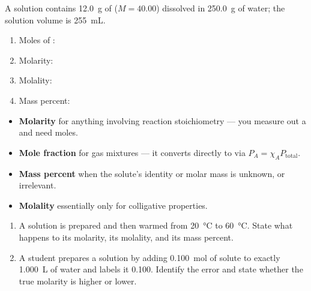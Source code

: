 \documentclass{apchem-notes}
\begin{document}

A solution contains \SI{12.0}{\gram} of  ($M = 40.00$) dissolved in
\SI{250.0}{\gram} of water; the solution volume is \SI{255}{\milli\liter}.

\begin{enumerate}[leftmargin=*,itemsep=0.35em]
  \item Moles of : 
  \item Molarity: 
  \item Molality: 
  \item Mass percent: 
\end{enumerate}



\begin{itemize}[leftmargin=*,itemsep=0.25em]
  \item \textbf{Molarity} for anything involving reaction stoichiometry ---
        you measure out a  and need moles.
  \item \textbf{Mole fraction} for gas mixtures --- it converts directly to
         via
        $P_A = \chi_A P_{\text{total}}$.
  \item \textbf{Mass percent} when the solute's identity or molar mass is
        unknown, or irrelevant.
  \item \textbf{Molality} essentially only for colligative properties.
\end{itemize}


\begin{enumerate}[leftmargin=*,itemsep=0.4em]
  \item A solution is prepared and then warmed from \SI{20}{\celsius} to
        \SI{60}{\celsius}. State what happens to its molarity, its molality,
        and its mass percent. 
  \item A student prepares a solution by adding \SI{0.100}{\mole} of solute
        to exactly \SI{1.000}{\liter} of water and labels it
        \SI{0.100}{\Molar}. Identify the error and state whether the true
        molarity is higher or lower. 
\end{enumerate}
\end{document}
